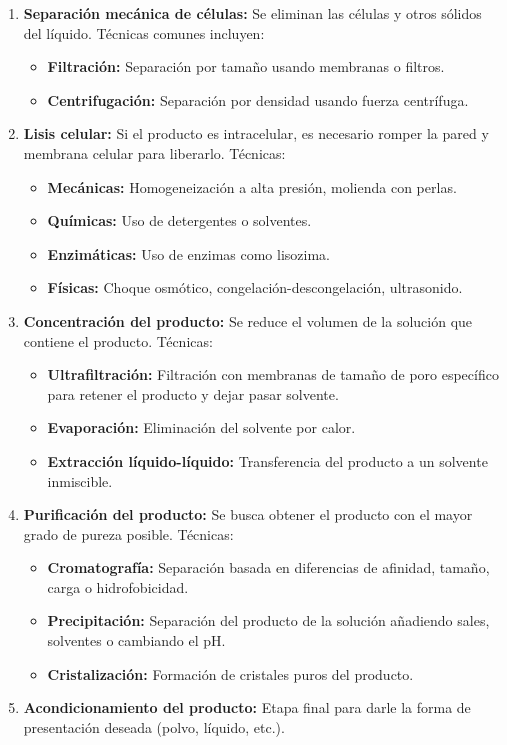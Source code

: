 \begin{enumerate}
    \item \textbf{Separación mecánica de células:} Se eliminan las células y otros sólidos del líquido. Técnicas comunes incluyen:
        \begin{itemize}
            \item \textbf{Filtración:} Separación por tamaño usando membranas o filtros.
            \item \textbf{Centrifugación:} Separación por densidad usando fuerza centrífuga.
        \end{itemize}
    \item \textbf{Lisis celular:} Si el producto es intracelular, es necesario romper la pared y membrana celular para liberarlo. Técnicas:
        \begin{itemize}
            \item \textbf{Mecánicas:} Homogeneización a alta presión, molienda con perlas.
            \item \textbf{Químicas:} Uso de detergentes o solventes.
            \item \textbf{Enzimáticas:} Uso de enzimas como lisozima.
            \item \textbf{Físicas:} Choque osmótico, congelación-descongelación, ultrasonido.
        \end{itemize}
    \item \textbf{Concentración del producto:} Se reduce el volumen de la solución que contiene el producto. Técnicas:
        \begin{itemize}
            \item \textbf{Ultrafiltración:} Filtración con membranas de tamaño de poro específico para retener el producto y dejar pasar solvente.
            \item \textbf{Evaporación:} Eliminación del solvente por calor.
            \item \textbf{Extracción líquido-líquido:} Transferencia del producto a un solvente inmiscible.
        \end{itemize}
    \item \textbf{Purificación del producto:} Se busca obtener el producto con el mayor grado de pureza posible. Técnicas:
        \begin{itemize}
            \item \textbf{Cromatografía:} Separación basada en diferencias de afinidad, tamaño, carga o hidrofobicidad.
            \item \textbf{Precipitación:} Separación del producto de la solución añadiendo sales, solventes o cambiando el pH.
            \item \textbf{Cristalización:} Formación de cristales puros del producto.
        \end{itemize}
    \item \textbf{Acondicionamiento del producto:} Etapa final para darle la forma de presentación deseada (polvo, líquido, etc.).
\end{enumerate}

